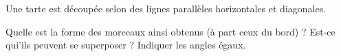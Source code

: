 

    Une tarte est découpée selon des lignes parallèles horizontales et diagonales.

\begin{center}
   
\end{center}

Quelle est la forme des morceaux ainsi obtenus (à part ceux du bord) ? Est-ce qui'ils peuvent se superposer ? Indiquer les angles égaux.



